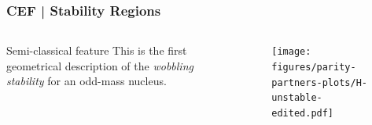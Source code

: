 \documentclass{beamer}
\begin{document}
\begin{frame}
	\frametitle{CEF | Stability Regions}
	\vspace{-0.5cm}
	\begin{columns}
		\begin{column}{0.45\textwidth}
			\begin{table}
				\centering
			\end{table}		
			\begin{alertblock}{Semi-classical feature}
				This is the first geometrical description of the \emph{wobbling stability} for an odd-mass nucleus.
			\end{alertblock}
		\end{column}
		\begin{column}{0.55\textwidth}
			\begin{figure}
				\centering
				\texttt{[image: figures/parity-partners-plots/H-unstable-edited.pdf]}
			\end{figure}
		\end{column}
	\end{columns}
\end{frame}
\end{document}

